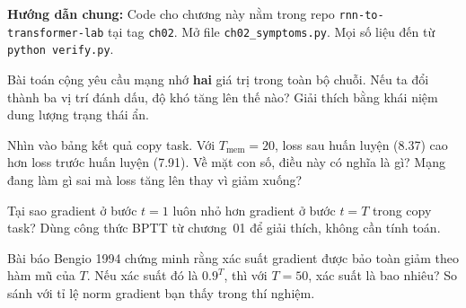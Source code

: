 %

\exercises

%

\par\textbf{Hướng dẫn chung:} Code cho chương này nằm trong repo
\texttt{rnn-to-transformer-lab} tại tag \texttt{ch02}.
Mở file \texttt{ch02_symptoms.py}.
Mọi số liệu đến từ \texttt{python verify.py}.

%

\tierunderstand

\begin{bt}
  \item Bài toán cộng yêu cầu mạng nhớ \textbf{hai} giá trị trong toàn bộ
    chuỗi. Nếu ta đổi thành ba vị trí đánh dấu, độ khó tăng lên thế nào?
    Giải thích bằng khái niệm dung lượng trạng thái ẩn.

  \item Nhìn vào bảng kết quả copy task. Với $T_{\text{mem}} = 20$, loss
    sau huấn luyện (8.37) cao hơn loss trước huấn luyện (7.91). Về mặt
    con số, điều này có nghĩa là gì? Mạng đang làm gì sai mà loss tăng
    lên thay vì giảm xuống?

  \item Tại sao gradient ở bước $t=1$ luôn nhỏ hơn gradient ở bước $t=T$
    trong copy task? Dùng công thức BPTT từ chương~01 để giải thích, không
    cần tính toán.

  \item Bài báo Bengio 1994 chứng minh rằng xác suất gradient được bảo
    toàn giảm theo hàm mũ của $T$. Nếu xác suất đó là $0.9^T$, thì với
    $T=50$, xác suất là bao nhiêu? So sánh với tỉ lệ norm gradient bạn
    thấy trong thí nghiệm.
\end{bt}

\tierapply

%

